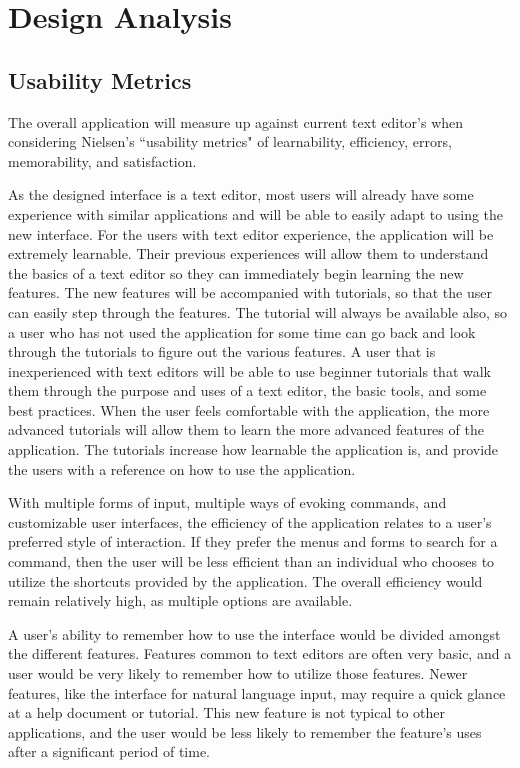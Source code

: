\documentclass[11pt, oneside]{article}
\begin{document}
\section{Design Analysis}
\subsection{Usability Metrics}
The overall application will measure up against current text editor's when considering Nielsen's ``usability metrics" of learnability, efficiency, errors, memorability, and satisfaction. 

As the designed interface is a text editor, most users will already have some experience with similar applications and will be able to easily adapt to using the new interface. For the users with text editor experience, the application will be extremely learnable. Their previous experiences will allow them to understand the basics of a text editor so they can immediately begin learning the new features. The new features will be accompanied with tutorials, so that the user can easily step through the features. The tutorial will always be available also, so a user who has not used the application for some time can go back and look through the tutorials to figure out the various features. A user that is inexperienced with text editors will be able to use beginner tutorials that walk them through the purpose and uses of a text editor, the basic tools, and some best practices. When the user feels comfortable with the application, the more advanced tutorials will allow them to learn the more advanced features of the application. The tutorials increase how learnable the application is, and provide the users with a reference on how to use the application.

With multiple forms of input, multiple ways of evoking commands, and customizable user interfaces, the efficiency of the application relates to a user's preferred style of interaction. If they prefer the menus and forms to search for a command, then the user will be less efficient than an individual who chooses to utilize the shortcuts provided by the application. The overall efficiency would remain relatively high, as multiple options are available.

A user's ability to remember how to use the interface would be divided amongst the different features. Features common to text editors are often very basic, and a user would be very likely to remember how to utilize those features. Newer features, like the interface for natural language input, may require a quick glance at a help document or tutorial. This new feature is not typical to other applications, and the user would be less likely to remember the feature's uses after a significant period of time.
\end{document}
